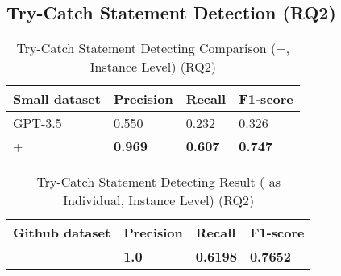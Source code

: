 \subsection{Try-Catch Statement Detection (RQ2)}
\label{sec:rq2}

\begin{table}[t]%
  \caption{Try-Catch Statement Detecting Comparison ({\xblock}+{\xstate}, Instance Level) (RQ2)}
  \vspace{-12pt}
  \small
	\begin{center}
		\renewcommand{\arraystretch}{1}
		\begin{tabular}{| p{3.05cm}<{\centering} | p{1.2cm}<{\centering} | p{1.2cm}<{\centering}| p{1.2cm}<{\centering}|}
		  \hline
		Small dataset	  & Precision  & Recall & F1-score \\
			\hline
                        GPT-3.5 & 0.550 & 0.232 & 0.326 \\
			\hline
			\xblock + \xstate   & \textbf{0.969}  &  \textbf{0.607} & \textbf{0.747}\\
			\hline
		\end{tabular}
		\label{tab:xstate-1}
	\end{center}
\end{table}

\begin{table}[t]%
\caption{Try-Catch Statement Detecting Result ({\xstate} as Individual, Instance Level) (RQ2)}
  \vspace{-12pt}
  \small
	\begin{center}
		\renewcommand{\arraystretch}{1}
		\begin{tabular}{| p{3.05cm}<{\centering} | p{1.2cm}<{\centering} | p{1.2cm}<{\centering}| p{1.2cm}<{\centering}|}
		  \hline
		Github dataset	  & Precision  & Recall & F1-score \\
			\hline
			\hline
			\xstate  & \textbf{1.0}  &  \textbf{0.6198} & \textbf{0.7652}\\
			\hline
		\end{tabular}
		\label{tab:xstate-2}
	\end{center}
\end{table}

